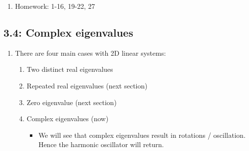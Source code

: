 \documentclass{article}
\begin{document}
\begin{enumerate}
\item Homework: 1-16, 19-22, 27

\end{enumerate}

\subsection{3.4: Complex eigenvalues}

\begin{enumerate}

\item There are four main cases with 2D linear systems:
\begin{enumerate}
\item Two distinct real eigenvalues
\item Repeated real eigenvalues (next section)
\item Zero eigenvalue (next section)
\item Complex eigenvalues (now)
\begin{itemize}
\item We will see that complex eigenvalues result in rotations / oscillation. Hence the harmonic oscillator will return.
\end{itemize}
\end{enumerate}


\end{enumerate}
\end{document}
